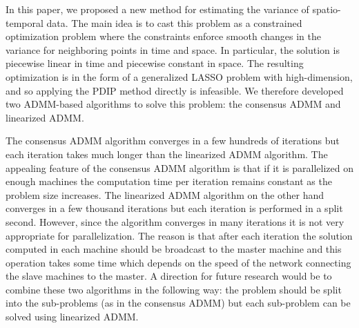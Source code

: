 \documentclass[letterpaper]{article} %
\newcommand{\attn}[1]{\textcolor{red}{TODO: #1}}
\begin{document}
In this paper, we proposed a new method for estimating the variance of
spatio-temporal data. The main idea is to cast this problem as a
constrained optimization problem where the constraints enforce smooth
changes in the variance for neighboring points in time and space. In
particular, the solution is piecewise linear in time and piecewise
constant in space. The resulting optimization is in the form of a
generalized LASSO problem with high-dimension, and so applying the
PDIP method directly is infeasible. We therefore developed two
ADMM-based algorithms to solve this problem: the consensus ADMM and
linearized ADMM. 

The consensus ADMM algorithm converges in a few hundreds of iterations
but each iteration takes much longer than the linearized ADMM
algorithm. The appealing feature of the consensus ADMM algorithm is
that if it is parallelized on enough machines the
computation time per iteration remains constant as the problem size
increases. The linearized ADMM algorithm on the other hand converges
in a few thousand iterations but each iteration is performed in a
split second. However, since the algorithm converges in many
iterations it is not very appropriate for parallelization. The reason
is that after each iteration the solution computed in each machine
should be broadcast to the master machine and this operation takes
some time which depends on the speed of the network connecting the
slave machines to the master. A direction for future research would be
to combine these two algorithms in the following way: the problem
should be split into the sub-problems (as in the consensus ADMM) but
each sub-problem can be solved using linearized ADMM. 


\end{document}

